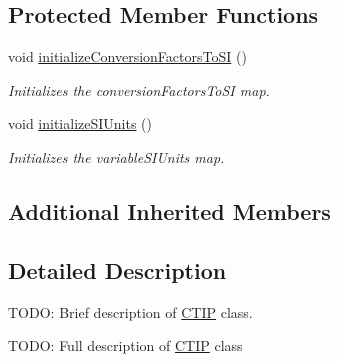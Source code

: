 \subsection*{Protected Member Functions}
\begin{DoxyCompactItemize}
\item 
void \hyperlink{classccmc_1_1_c_t_i_p_a082ab812295cbbbd31a8a60d723ca518}{initialize\-Conversion\-Factors\-To\-S\-I} ()
\begin{DoxyCompactList}\small\item\em Initializes the conversion\-Factors\-To\-S\-I map.  \end{DoxyCompactList}\item 
void \hyperlink{classccmc_1_1_c_t_i_p_abcd6a28de17688978f7cee2e7798f9e8}{initialize\-S\-I\-Units} ()
\begin{DoxyCompactList}\small\item\em Initializes the variable\-S\-I\-Units map.  \end{DoxyCompactList}\end{DoxyCompactItemize}
\subsection*{Additional Inherited Members}


\subsection{Detailed Description}
T\-O\-D\-O\-: Brief description of \hyperlink{classccmc_1_1_c_t_i_p}{C\-T\-I\-P} class. 

T\-O\-D\-O\-: Full description of \hyperlink{classccmc_1_1_c_t_i_p}{C\-T\-I\-P} class 

